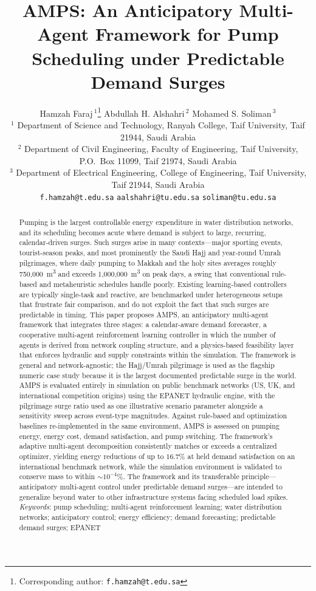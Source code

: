 \documentclass[11pt,a4paper]{article}
\title{\textbf{AMPS: An Anticipatory Multi-Agent Framework for Pump Scheduling
under Predictable Demand Surges}}
\author{
Hamzah Faraj\,$^{1}$\thanks{Corresponding author: \texttt{f.hamzah@t.edu.sa}}
\quad Abdullah H. Alshahri\,$^{2}$
\quad Mohamed S. Soliman\,$^{3}$ \\[4pt]
\small $^{1}$ Department of Science and Technology, Ranyah College, Taif University, Taif 21944, Saudi Arabia \\
\small $^{2}$ Department of Civil Engineering, Faculty of Engineering, Taif University, P.O.\ Box 11099, Taif 21974, Saudi Arabia \\
\small $^{3}$ Department of Electrical Engineering, College of Engineering, Taif University, Taif 21944, Saudi Arabia \\[2pt]
\small \texttt{f.hamzah@t.edu.sa} \quad \texttt{aalshahri@tu.edu.sa} \quad \texttt{soliman@tu.edu.sa}}
\date{}
\begin{document}
\maketitle

\begin{abstract}
\noindent
Pumping is the largest controllable energy expenditure in water distribution
networks, and its scheduling becomes acute where demand is subject to large,
recurring, calendar-driven surges. Such surges arise in many contexts---major
sporting events, tourist-season peaks, and most prominently the Saudi Hajj and
year-round Umrah pilgrimages, where daily pumping to Makkah and the holy sites
averages roughly 750{,}000~m\textsuperscript{3} and exceeds
1{,}000{,}000~m\textsuperscript{3} on peak days, a swing that conventional
rule-based and metaheuristic schedules handle poorly. Existing learning-based
controllers are typically single-task and reactive, are benchmarked under
heterogeneous setups that frustrate fair comparison, and do not exploit the fact
that such surges are predictable in timing. This paper proposes AMPS, an
anticipatory multi-agent framework that integrates three stages: a
calendar-aware demand forecaster, a cooperative multi-agent reinforcement
learning controller in which the number of agents is derived from network
coupling structure, and a physics-based feasibility layer that enforces
hydraulic and supply constraints within the simulation. The framework is general
and network-agnostic; the Hajj/Umrah pilgrimage is used as the flagship numeric
case study because it is the largest documented predictable surge in the world.
AMPS is evaluated entirely in simulation on public benchmark networks (US, UK,
and international competition origins) using the EPANET hydraulic engine, with
the pilgrimage surge ratio used as one illustrative scenario parameter alongside
a sensitivity sweep across event-type magnitudes. Against rule-based and
optimization baselines re-implemented in the same environment, AMPS is assessed
on pumping energy, energy cost, demand satisfaction, and pump switching. The
framework's adaptive multi-agent decomposition consistently matches or exceeds a
centralized optimizer, yielding energy reductions of up to $16.7\%$ at held
demand satisfaction on an international benchmark network, while the simulation
environment is validated to conserve mass to within $\sim\!10^{-4}\%$.
The framework and its transferable principle---anticipatory multi-agent control
under predictable demand surges---are intended to generalize beyond water to
other infrastructure systems facing scheduled load spikes.
\\[6pt]
\textit{Keywords}: pump scheduling; multi-agent reinforcement learning; water
distribution networks; anticipatory control; energy efficiency; demand
forecasting; predictable demand surges; EPANET
\end{abstract}
\end{document}
